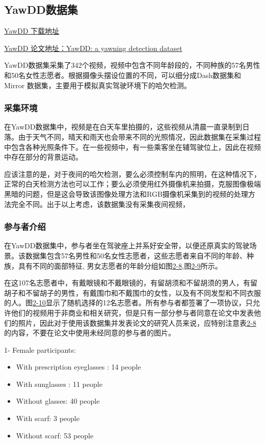 \subsection{YawDD数据集}

\href{https://ieee-dataport.org/data-formats/video-640x480-24-bit-true-color-rgb-30-fps-avi-without-audio}{YawDD 下载地址}

\href{https://dl.acm.org/doi/10.1145/2557642.2563678}{YawDD 论文地址：YawDD: a yawning detection dataset}

YawDD数据集采集了342个视频，视频中包含不同年龄段的，不同种族的57名男性和50名女性志愿者。根据摄像头摆设位置的不同，可以细分成Dash数据集和Mirror 数据集，主要用于模拟真实驾驶环境下的哈欠检测。

\subsubsection{采集环境}

在YawDD数据集中，视频是在白天车里拍摄的，这些视频从清晨一直录制到日落。由于天气不同，晴天和雨天也会带来不同的光照情况，因此数据集在采集过程中包含各种光照条件下。在一些视频中，有一些乘客坐在辅驾驶位上，因此在视频中存在部分的背景运动。

应该注意的是，对于夜间的哈欠检测，要么必须控制车内的照明，在这种情况下，正常的白天检测方法也可以工作；要么必须使用红外摄像机来拍摄，克服图像极端黑暗的问题，但是这会导致该图像处理方法和RGB摄像机采集到的视频的处理方法完全不同。出于以上考虑，该数据集没有采集夜间视频，

\subsubsection{参与者介绍}

在YawDD数据集中，参与者坐在驾驶座上并系好安全带，以便还原真实的驾驶场景。该数据集包含57名男性和50名女性志愿者，这些志愿者来自不同的年龄、种族，具有不同的面部特征, 男女志愿者的年龄分组如图\href{figure:2-8}{2-8},图\href{figure:2-9}{2-9}所示。

在这107名志愿者中，有戴眼镜和不戴眼镜的，有留胡须和不留胡须的男人，有留胡子和不留胡子的男性，有戴围巾和不戴围巾的女性，以及有不同发型和不同衣服的人。图\href{figure:2-10}{2-10}显示了随机选择的12名志愿者。所有参与者都签署了一项协议，只允许他们的视频用于非商业和相关研究，但是只有一部分参与者同意在论文中发表他们的照片，因此对于使用该数据集并发表论文的研究人员来说，应特别注意表\href{table:2-8}{2-8}的内容，不要在论文中使用未经同意的参与者的图片。

1- Female participants:
\begin{itemize}
    \item With prescription eyeglasses : 14 people
    \item With sunglasses : 11 people
    \item Without glasses: 40 people
    \item With scarf: 3 people
    \item Without scarf: 53 people \\
\end{itemize}

